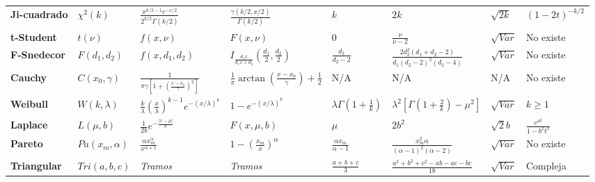 \documentclass[10pt,a4paper]{article}
\begin{document}
\begin{small}
\begin{longtable}{p{1.8cm} p{1.6cm} p{3cm} p{3cm} p{1.5cm} p{1.5cm} p{1.5cm} p{2.5cm}}
\textbf{Ji-cuadrado} & $\chi^2(k)$ & $\frac{x^{k/2-1} e^{-x/2}}{2^{k/2}\Gamma(k/2)}$ & $\frac{\gamma(k/2, x/2)}{\Gamma(k/2)}$ & $k$ & $2k$ & $\sqrt{2k}$ & $(1-2t)^{-k/2}$ \\ \addlinespace
\textbf{t-Student} & $t(\nu)$ & $f(x, \nu)$ & $F(x, \nu)$ & $0$ & $\frac{\nu}{\nu-2}$ & $\sqrt{Var}$ & No existe \\ \addlinespace
\textbf{F-Snedecor} & $F(d_1, d_2)$ & $f(x, d_1, d_2)$ & $I_{\frac{d_1 x}{d_1 x + d_2}}(\frac{d_1}{2}, \frac{d_2}{2})$ & $\frac{d_2}{d_2-2}$ & $\frac{2d_2^2(d_1+d_2-2)}{d_1(d_2-2)^2(d_2-4)}$ & $\sqrt{Var}$ & No existe \\ \addlinespace
\textbf{Cauchy} & $C(x_0, \gamma)$ & $\frac{1}{\pi\gamma [1+(\frac{x-x_0}{\gamma})^2]}$ & $\frac{1}{\pi} \arctan(\frac{x-x_0}{\gamma}) + \frac{1}{2}$ & N/A & N/A & N/A & No existe \\ \addlinespace
\textbf{Weibull} & $W(k, \lambda)$ & $\frac{k}{\lambda}(\frac{x}{\lambda})^{k-1} e^{-(x/\lambda)^k}$ & $1-e^{-(x/\lambda)^k}$ & $\lambda\Gamma(1+\frac{1}{k})$ & $\lambda^2[\Gamma(1+\frac{2}{k})-\mu^2]$ & $\sqrt{Var}$ & $k \geq 1$ \\ \addlinespace
\textbf{Laplace} & $L(\mu, b)$ & $\frac{1}{2b} e^{-\frac{|x-\mu|}{b}}$ & $F(x, \mu, b)$ & $\mu$ & $2b^2$ & $\sqrt{2}b$ & $\frac{e^{\mu t}}{1-b^2 t^2}$ \\ \addlinespace
\textbf{Pareto} & $Pa(x_m, \alpha)$ & $\frac{\alpha x_m^\alpha}{x^{\alpha+1}}$ & $1-(\frac{x_m}{x})^\alpha$ & $\frac{\alpha x_m}{\alpha-1}$ & $\frac{x_m^2 \alpha}{(\alpha-1)^2(\alpha-2)}$ & $\sqrt{Var}$ & No existe \\ \addlinespace
\textbf{Triangular} & $Tri(a, b, c)$ & \textit{Tramos} & \textit{Tramos} & $\frac{a+b+c}{3}$ & $\frac{a^2+b^2+c^2-ab-ac-bc}{18}$ & $\sqrt{Var}$ & Compleja \\ \bottomrule
\end{longtable}
\end{small}
\end{document}
